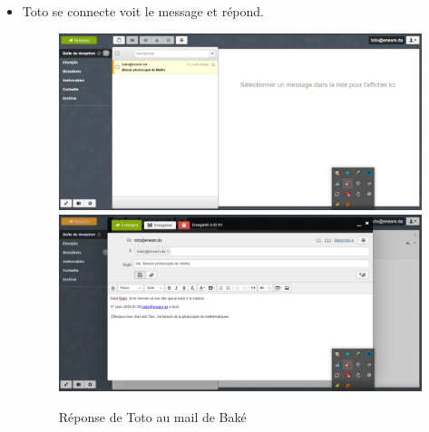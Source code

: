 \documentclass[a4paper,12pt,french]{report} %
\begin{document}
\begin{itemize}
\item Toto se connecte voit le message et répond.
\begin{figure}[H]
\centering
\includegraphics[width=483pt]{figure/toto_see_mail_from_bake1.png} \\[1cm]
\includegraphics[width=483pt]{figure/toto_reply_to_bake1.png}
\caption{Réponse de Toto au mail de Baké}
\end{figure} 


\end{itemize}
\end{document}
